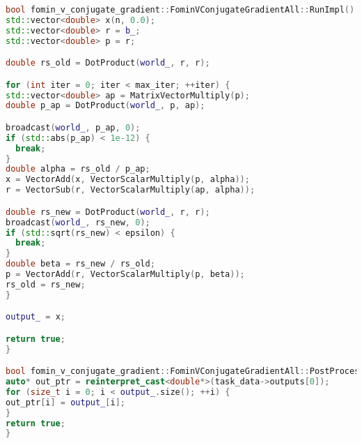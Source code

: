 \documentclass[12pt]{article}
\begin{document}
\begin{lstlisting}[language=C++]
bool fomin_v_conjugate_gradient::FominVConjugateGradientAll::RunImpl() {
std::vector<double> x(n, 0.0);
std::vector<double> r = b_;
std::vector<double> p = r;

double rs_old = DotProduct(world_, r, r);

for (int iter = 0; iter < max_iter; ++iter) {
std::vector<double> ap = MatrixVectorMultiply(p);
double p_ap = DotProduct(world_, p, ap);

broadcast(world_, p_ap, 0);
if (std::abs(p_ap) < 1e-12) {
  break;
}
double alpha = rs_old / p_ap;
x = VectorAdd(x, VectorScalarMultiply(p, alpha));
r = VectorSub(r, VectorScalarMultiply(ap, alpha));

double rs_new = DotProduct(world_, r, r);
broadcast(world_, rs_new, 0);
if (std::sqrt(rs_new) < epsilon) {
  break;
}
double beta = rs_new / rs_old;
p = VectorAdd(r, VectorScalarMultiply(p, beta));
rs_old = rs_new;
}

output_ = x;

return true;
}

bool fomin_v_conjugate_gradient::FominVConjugateGradientAll::PostProcessingImpl() {
auto* out_ptr = reinterpret_cast<double*>(task_data->outputs[0]);
for (size_t i = 0; i < output_.size(); ++i) {
out_ptr[i] = output_[i];
}
return true;
}
\end{lstlisting}
\newpage
\begin{lstlisting}[language=C++]
  
\end{lstlisting}
\end{document}
